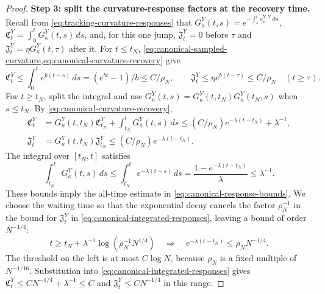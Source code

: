 \begin{proof}
\par\noindent\textbf{Step 3: split the curvature-response factors at the recovery time.}
Recall from \eqref{eq:tracking-curvature-responses} that
$G_\kappa^Y(t,s)=e^{-\int_s^t\kappa_u^{Y,N}\,du}$,
$\mathfrak C_t^Y=\int_0^tG_\kappa^Y(t,s)\,ds$, and, for this one jump,
$\mathfrak J_t^Y=0$ before $\tau$ and
$\mathfrak J_t^Y=\eta G_\kappa^Y(t,\tau)$ after it.
For $t\le t_N$, \cref{eq:canonical-sampled-curvature,eq:canonical-curvature-recovery} give
\[
 \mathfrak C_t^Y\le\int_0^te^{b(t-s)}\,ds=(e^{bt}-1)/b\le C/\rho_N,
 \qquad
 \mathfrak J_t^Y\le\eta e^{b(t-\tau)}\le C/\rho_N\quad(t\ge\tau).
\]
For $t\ge t_N$, split the integral and use
$G_\kappa^Y(t,s)=G_\kappa^Y(t,t_N)G_\kappa^Y(t_N,s)$ when $s\le t_N$.
By \eqref{eq:canonical-curvature-recovery},
\begin{equation}
 \begin{aligned}
 \mathfrak C_t^Y
 &=G_\kappa^Y(t,t_N)\mathfrak C_{t_N}^Y+\int_{t_N}^tG_\kappa^Y(t,s)\,ds
 \le(C/\rho_N)e^{-\lambda(t-t_N)}+\lambda^{-1},\\
 \mathfrak J_t^Y
 &=G_\kappa^Y(t,t_N)\mathfrak J_{t_N}^Y
 \le(C/\rho_N)e^{-\lambda(t-t_N)}.
 \end{aligned}
 \label{eq:canonical-integrated-responses}
\end{equation}
The integral over $[t_N,t]$ satisfies
\[
 \int_{t_N}^tG_\kappa^Y(t,s)\,ds
 \le\int_{t_N}^te^{-\lambda(t-s)}\,ds
 =\frac{1-e^{-\lambda(t-t_N)}}{\lambda}\le\lambda^{-1}.
\]
These bounds imply the all-time estimate in \eqref{eq:canonical-response-bounds}.
We choose the waiting time so that the exponential decay cancels the factor
$\rho_N^{-1}$ in the bound for $\mathfrak J_t^Y$ in
\cref{eq:canonical-integrated-responses}, leaving a bound of order $N^{-1/4}$:
\begin{equation}
 t\ge t_N+\lambda^{-1}\log(\rho_N^{-1}N^{1/4})
 \quad\Longrightarrow\quad e^{-\lambda(t-t_N)}\le\rho_NN^{-1/4}.
 \label{eq:canonical-late-time}
\end{equation}
The threshold on the left is at most $C\log N$, because
$\rho_N$ is a fixed multiple of $N^{-1/16}$.
Substitution into \eqref{eq:canonical-integrated-responses} gives
$\mathfrak C_t^Y\le CN^{-1/4}+\lambda^{-1}\le C$ and
$\mathfrak J_t^Y\le CN^{-1/4}$ in this range.


\end{proof}
